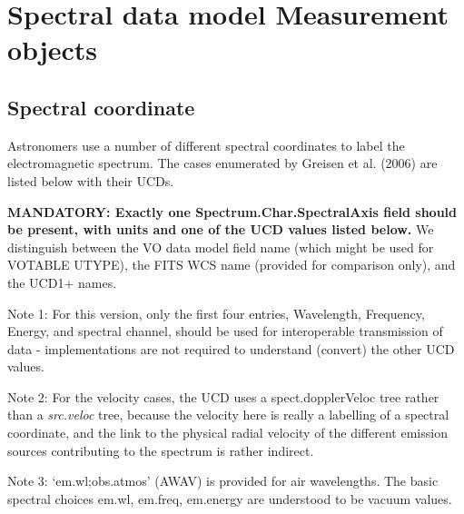 \documentclass[11pt]{article}
\newcommand{\htwidth}[1]{}
\begin{document}
\htwidth{700}



\htwidth{0}

\section{Spectral data model Measurement objects}

\subsection{Spectral coordinate}

Astronomers use a number of different spectral coordinates
to label the electromagnetic spectrum. The cases enumerated
by Greisen et al. (2006) are listed below with their UCDs.

{\bf MANDATORY: Exactly one Spectrum.Char.SpectralAxis field should be present,
with units and one of the UCD values listed below.}
We distinguish between the VO data model field name (which might
be used for VOTABLE UTYPE),
the FITS WCS name (provided for comparison only), and the UCD1+ names.

Note 1: For this version, only the first four entries, Wavelength,
Frequency, Energy, and spectral channel, should be used for
interoperable transmission of data - implementations are not required to
understand (convert) the other UCD values. 

Note 2: For the velocity cases, the UCD uses a spect.dopplerVeloc tree
rather than a {\it src.veloc } tree, because the velocity here
is really a labelling of a spectral coordinate, and the link to
the physical radial velocity of the different emission sources contributing
to the spectrum is rather indirect.

Note 3: `em.wl;obs.atmos' (AWAV) is provided for air wavelengths. The basic spectral
choices em.wl, em.freq, em.energy are understood to be vacuum values.
\end{document}
